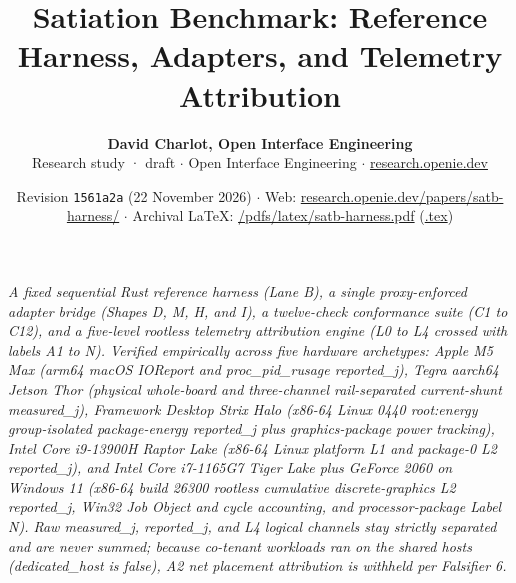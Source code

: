 \documentclass[10pt,letterpaper]{article}
\title{\vspace{-1.2em}\textbf{Satiation Benchmark: Reference Harness, Adapters, and Telemetry Attribution}}
\author{\textbf{David Charlot, Open Interface Engineering}\\[0.15em]
{\small Research study · draft $\cdot$ Open Interface Engineering $\cdot$ \href{https://research.openie.dev}{research.openie.dev}}}
\date{\small Revision \texttt{1561a2a} (22 November 2026) $\cdot$ Web: \href{https://research.openie.dev/papers/satb-harness/}{research.openie.dev/papers/satb-harness/} $\cdot$ Archival LaTeX: \href{https://research.openie.dev/pdfs/latex/satb-harness.pdf}{/pdfs/latex/satb-harness.pdf} (\href{https://research.openie.dev/pdfs/latex/satb-harness.tex}{.tex})}
\begin{document}
\maketitle
\vspace{-0.6em}

\noindent{}

\vspace{6pt}
\hspace{8pt}%
\parbox{\dimexpr\linewidth-11pt\relax}{%
  \small\itshape\color{openieSlate}%
  A fixed sequential Rust reference harness (Lane B), a single proxy-enforced adapter bridge (Shapes D, M, H, and I), a twelve-check conformance suite (C1 to C12), and a five-level rootless telemetry attribution engine (L0 to L4 crossed with labels A1 to N). Verified empirically across five hardware archetypes: Apple M5 Max (arm64 macOS IOReport and proc\_pid\_rusage reported\_j), Tegra aarch64 Jetson Thor (physical whole-board and three-channel rail-separated current-shunt measured\_j), Framework Desktop Strix Halo (x86-64 Linux 0440 root:energy group-isolated package-energy reported\_j plus graphics-package power tracking), Intel Core i9-13900H Raptor Lake (x86-64 Linux platform L1 and package-0 L2 reported\_j), and Intel Core i7-1165G7 Tiger Lake plus GeForce 2060 on Windows 11 (x86-64 build 26300 rootless cumulative discrete-graphics L2 reported\_j, Win32 Job Object and cycle accounting, and processor-package Label N). Raw measured\_j, reported\_j, and L4 logical channels stay strictly separated and are never summed; because co-tenant workloads ran on the shared hosts (dedicated\_host is false), A2 net placement attribution is withheld per Falsifier 6.
}
\vspace{6pt}
\end{document}
